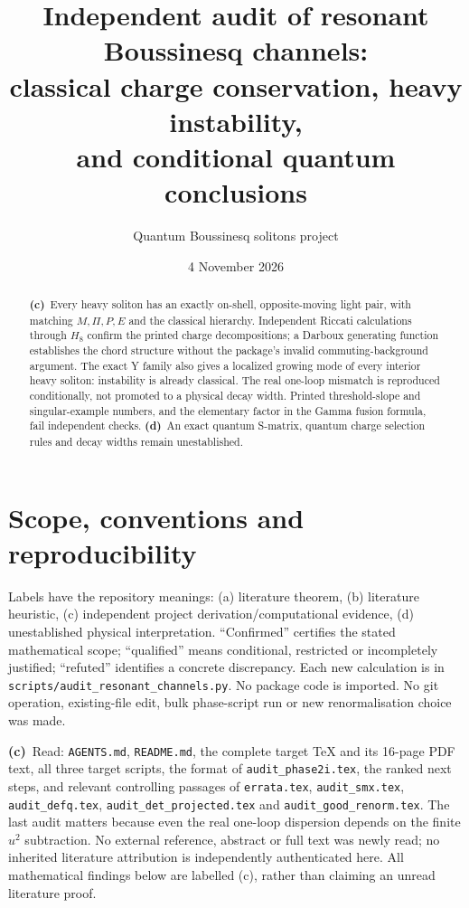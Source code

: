 \documentclass[11pt,a4paper]{article}
\title{Independent audit of resonant Boussinesq channels:\\classical charge conservation, heavy instability,\\and conditional quantum conclusions}
\author{Quantum Boussinesq solitons project}
\date{4 November 2026}
\newcommand{\Lc}{\textbf{(c)}\ }
\newcommand{\Ld}{\textbf{(d)}\ }
\newcommand{\scr}{\texttt{audit\_\allowbreak resonant\_\allowbreak channels.py}}
\begin{document}
\maketitle
\begin{abstract}
\Lc Every heavy soliton has an exactly on-shell, opposite-moving light pair,
with matching $M,\Pi,P,E$ and the classical hierarchy. Independent Riccati
calculations through $H_8$ confirm the printed charge decompositions; a Darboux
generating function establishes the chord structure without the package's
invalid commuting-background argument. The exact Y family also gives a
localized growing mode of every interior heavy soliton: instability is already
classical. The real one-loop mismatch is reproduced conditionally, not promoted
to a physical decay width. Printed threshold-slope and singular-example numbers,
and the elementary factor in the Gamma fusion formula, fail independent checks.
\Ld An exact quantum S-matrix, quantum charge selection rules and decay widths
remain unestablished.
\end{abstract}

\section{Scope, conventions and reproducibility}
Labels have the repository meanings: (a) literature theorem, (b) literature
heuristic, (c) independent project derivation/computational evidence, (d)
unestablished physical interpretation. ``Confirmed'' certifies the stated
mathematical scope; ``qualified'' means conditional, restricted or incompletely
justified; ``refuted'' identifies a concrete discrepancy. Each new calculation
is in \texttt{scripts/}\scr. No package code is imported. No git operation,
existing-file edit, bulk phase-script run or new renormalisation choice was made.

\Lc Read: \texttt{AGENTS.md}, \texttt{README.md}, the complete target TeX and its
16-page PDF text, all three target scripts, the format of
\texttt{audit\_phase2i.tex}, the ranked next steps, and relevant controlling
passages of \texttt{errata.tex}, \texttt{audit\_smx.tex},
\texttt{audit\_defq.tex}, \texttt{audit\_det\_projected.tex} and
\texttt{audit\_good\_renorm.tex}. The last audit matters because even the real
one-loop dispersion depends on the finite $u^2$ subtraction. No external
reference, abstract or full text was newly read; no inherited literature
attribution is independently authenticated here. All mathematical findings
below are labelled (c), rather than claiming an unread literature proof.
\end{document}
